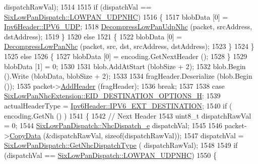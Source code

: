 \begin{DoxyCode}
      dispatchRawVal);
1514 
1515           \textcolor{keywordflow}{if} (dispatchVal == \hyperlink{classns3_1_1SixLowPanDispatch_acbf93399dca3b5424dcc76de45a57f5faf1d4da6a831d704993ea3946327c8c0c}{SixLowPanDispatch::LOWPAN\_UDPNHC})
1516             \{
1517               blobData [0] = \hyperlink{classns3_1_1Ipv6Header_a226429221a066c5e3b1f260caf27d1e9aef42146d6b211521c22f827b04530253}{Ipv6Header::IPV6\_UDP};
1518               \hyperlink{classns3_1_1SixLowPanNetDevice_a0b31fbe0bdc3a4dd59b9f7426aec8ed8}{DecompressLowPanUdpNhc} (packet, srcAddress, dstAddress);
1519             \}
1520           \textcolor{keywordflow}{else}
1521             \{
1522               blobData [0] = \hyperlink{classns3_1_1SixLowPanNetDevice_af69701425fa2e02ab4a7fdcd1db99cc8}{DecompressLowPanNhc} (packet, src, dst, srcAddress, 
      dstAddress);
1523             \}
1524         \}
1525       \textcolor{keywordflow}{else}
1526         \{
1527           blobData [0] = encoding.GetNextHeader ();
1528         \}
1529       blobData [1] = 0;
1530 
1531       blob.AddAtStart (blobSize + 2);
1532       blob.Begin ().Write (blobData, blobSize + 2);
1533 
1534       fragHeader.Deserialize (blob.Begin ());
1535       packet->\hyperlink{classns3_1_1Packet_a465108c595a0bc592095cbcab1832ed8}{AddHeader} (fragHeader);
1536       \textcolor{keywordflow}{break};
1537 
1538     \textcolor{keywordflow}{case} \hyperlink{classns3_1_1SixLowPanNhcExtension_ac692a22abe80c30bcbafa57ef36bf5ada874ee6f734081d5152bc6bf4ac1737c7}{SixLowPanNhcExtension::EID\_DESTINATION\_OPTIONS\_H}:
1539       actualHeaderType = \hyperlink{classns3_1_1Ipv6Header_a226429221a066c5e3b1f260caf27d1e9abfe6e82da1c9945685a3bf9dbfbe974b}{Ipv6Header::IPV6\_EXT\_DESTINATION};
1540       \textcolor{keywordflow}{if} ( encoding.GetNh () )
1541         \{
1542           \textcolor{comment}{// Next Header}
1543           uint8\_t dispatchRawVal = 0;
1544           \hyperlink{classns3_1_1SixLowPanDispatch_acbf93399dca3b5424dcc76de45a57f5f}{SixLowPanDispatch::NhcDispatch\_e} dispatchVal;
1545 
1546           packet->\hyperlink{classns3_1_1Packet_a5a6d304b9e0d90733919ffe224b98f0d}{CopyData} (&dispatchRawVal, \textcolor{keyword}{sizeof}(dispatchRawVal));
1547           dispatchVal = \hyperlink{classns3_1_1SixLowPanDispatch_aadc1e9ded2e292f557da546a6a4e49d2}{SixLowPanDispatch::GetNhcDispatchType} (
      dispatchRawVal);
1548 
1549           \textcolor{keywordflow}{if} (dispatchVal == \hyperlink{classns3_1_1SixLowPanDispatch_acbf93399dca3b5424dcc76de45a57f5faf1d4da6a831d704993ea3946327c8c0c}{SixLowPanDispatch::LOWPAN\_UDPNHC})
1550             \{

\end{DoxyCode}

